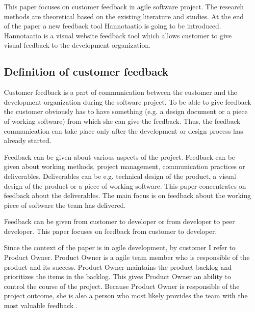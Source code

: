 \documentclass[conference]{IEEEtran}
\begin{document}
This paper focuses on customer feedback in agile software project. The research methods are theoretical based on the existing literature and studies. At the end of the paper a new feedback tool Hannotaatio is going to be introduced. Hannotaatio is a visual website feedback tool which allows customer to give visual feedback to the development organization.



\subsection{Definition of customer feedback}


Customer feedback is a part of communication between the customer and the development organization during the software project. To be able to give feedback the customer obviously has to have something (e.g. a design document or a piece of working software) from which she can give the feedback. Thus, the feedback communication can take place only after the development or design process has already started.

Feedback can be given about various aspects of the project. Feedback can be given about working methods, project management, communication practices or deliverables. Deliverables can be e.g. technical design of the product, a visual design of the product or a piece of working software. This paper concentrates on feedback about the deliverables. The main focus is on feedback about the working piece of software the team has delivered.

Feedback can be given from customer to developer or from developer to peer developer. This paper focuses on feedback from customer to developer. 

Since the context of the paper is in agile development, by customer I refer to Product Owner. Product Owner is a agile team member who is responsible of the product and its success. Product Owner maintains the product backlog and  prioritizes the items in the backlog. This gives Product Owner an ability to control the course of the project. Because Product Owner is responsible of the project outcome, she is also a person who most likely provides the team with the most valuable feedback \cite{2010pichler}.
\end{document}
